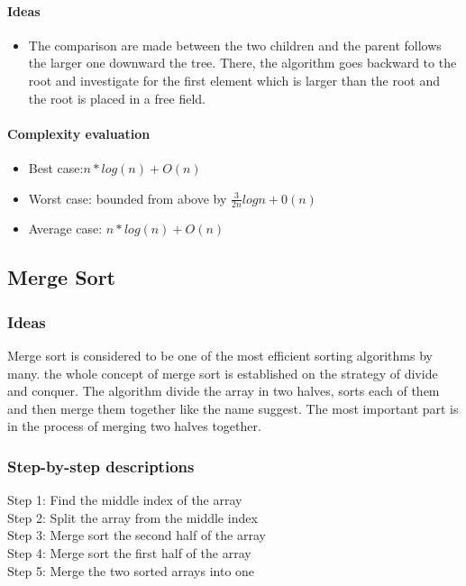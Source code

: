 \documentclass{article}
\newcommand\tab[1][0.5cm]{\hspace*{#1}}
\begin{document}
\paragraph{\tab Ideas}

\begin{itemize}
    \item The comparison are made between the two children and the parent follows the larger one downward the tree. There, the algorithm goes backward to the root and investigate for the first element which is larger than the root and the root is placed in a free field.
\end{itemize}

\paragraph{\tab Complexity evaluation}

\begin{itemize}
    \item Best case:$n*log(n) + O(n)$ 
    
    \item Worst case: bounded from above by $\frac{3}{2n} logn+0(n)$
    
    \item Average case: $n*log(n) + O(n)$
\end{itemize}

\pagebreak


\subsection{Merge Sort}

\subsubsection{Ideas}
\tab Merge sort is considered to be one of the most efficient sorting algorithms by many. the whole concept of merge sort is established on the strategy of divide and conquer. The algorithm divide the array in two halves, sorts each of them and then merge them together like the name suggest. The most important part is in the process of merging two halves together.

\bigskip

\subsubsection{Step-by-step descriptions}
Step 1: Find the middle index of the array\\
Step 2: Split the array from the middle index\\
Step 3: Merge sort the second half of the array\\
Step 4: Merge sort the first half of the array\\
Step 5: Merge the two sorted arrays into one\\
\end{document}
